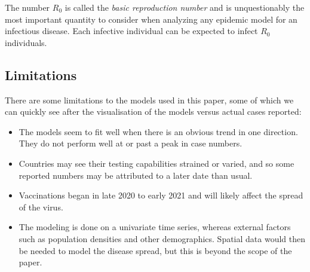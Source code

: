 \begin{ndefinition} 
The number $R_0$ is called
the \textit{basic reproduction number} and is unquestionably the most important quantity to consider when analyzing any epidemic model for an infectious disease. Each infective individual can be expected to infect $R_0$ individuals. 
\end{ndefinition}

\subsection{Limitations}
There are some limitations to the models used in this paper, some of which we can quickly see after the visualisation of the models versus actual cases reported:
\begin{itemize}
\item The models seem to fit well when there is an obvious trend in one direction. They do not perform well at or past a peak in case numbers. 
\item Countries may see their testing capabilities strained or varied, and so some reported numbers may be attributed to a later date than usual.
\item Vaccinations began in late 2020 to early 2021 and will likely affect the spread of the virus.
\item The modeling is done on a univariate time series, whereas external factors such as population densities and other demographics. Spatial data would then be needed to model the disease spread, but this is beyond the scope of the paper.
\end{itemize}